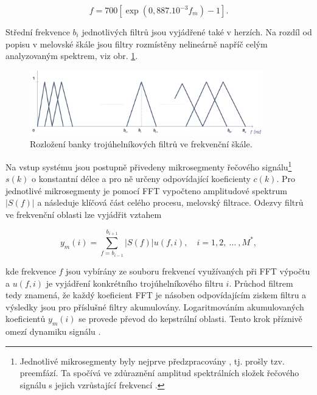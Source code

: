 \begin{equation}
  f = 700 \left[ \exp\left( 0,887.10^{-3} f_m \right) - 1 \right].
  \label{eq:asr:mfcc:melscale:inverse}
\end{equation}

\noindent Střední frekvence $b_i$ jednotlivých filtrů jsou vyjádřené také v herzích. Na rozdíl od popisu v melovské škále jsou filtry rozmístěny nelineárně napříč celým analyzovaným spektrem, viz obr. \ref{fig:asr:mfcc:bank:hz}.

\begin{figure}[hbpt]
  \centering
  \includegraphics[width=0.9\textwidth]{./ch4-asr/img/filter_bank-hz.pdf}
  \caption{Rozložení banky trojúhelníkových filtrů ve frekvenční škále.}
  \label{fig:asr:mfcc:bank:hz}
\end{figure}

Na vstup systému jsou postupně přivedeny mikrosegmenty řečového signálu\footnote{Jednotlivé mikrosegmenty byly nejprve předzpracovány , tj. prošly tzv. preemfází. Ta spočívá ve zdůraznění amplitud spektrálních složek řečového signálu s jejich vzrůstající frekvencí \cite{Psutka2006}.} $s\left(k\right)$ o konstantní délce a pro ně určeny odpovídající koeficienty $c\left(k\right)$. Pro jednotlivé mikrosegmenty je pomocí FFT vypočteno amplitudové spektrum $\left| S(f) \right|$ a následuje klíčová část celého procesu, melovský filtrace. Odezvy filtrů ve frekvenční oblasti lze vyjádřit vztahem

\begin{equation}
  y_m(i) = \sum_{f=b_{i-1}}^{b_{i+1}} \left| S(f) \right| u\left(f, i\right),  \quad i = 1, 2,\ \dots\ ,M^{*},
  \label{eq:asr:mfcc:freq:responce}
\end{equation}

\noindent kde frekvence $f$ jsou vybírány ze souboru frekvencí využívaných při FFT výpočtu a $u(f, i)$ je vyjádření konkrétního trojúhelníkového filtru $i$. Průchod filtrem tedy znamená, že každý koeficient FFT je násoben odpovídajícím ziskem filtru a výsledky jsou pro příslušné filtry akumulovány. Logaritmováním akumulovaných koeficientů $y_{m}(i)$ se provede převod do kepstrální oblasti. Tento krok příznivě omezí dynamiku signálu \cite{Benesty2007}.

